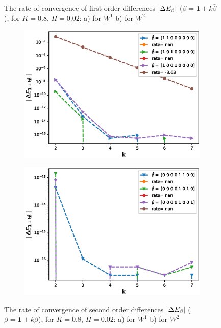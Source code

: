 \documentclass[11pt]{article}
\begin{document}
\begin{figure}[h!]
\caption{The rate of convergence of  first order differences $\left\lvert\Delta E_{\beta}\right\rvert$ ($\beta=\mathbf{1}+k \bar{\beta}$), for $K=0.8$, $H=0.02$: a) for $W^1$ b) for $W^2$}
\label{fig:first_diff_comp_K_08_H_002_wihtout_change_measure}
\end{figure}


\begin{figure}[h!]
\centering
\begin{subfigure}{.4\textwidth}
\centering
\includegraphics[width=1\linewidth]{./figures/rBergomi_mixed_error_rates/without_change_measure/N_4/H_002/mixed_difference_order2_rbergomi_4steps_H_002_K_08_totally_hierarch_with_rate_W1}
\caption{}
\label{fig:sub3}
\end{subfigure}%
\begin{subfigure}{.4\textwidth}
\centering
\includegraphics[width=1\linewidth]{./figures/rBergomi_mixed_error_rates/without_change_measure/N_4/H_002/mixed_difference_order2_rbergomi_4steps_H_002_K_08_totally_hierarch_with_rate_W2}
\caption{}
\label{fig:sub4}
\end{subfigure}

\caption{The rate of convergence of  second order differences $\left\lvert\Delta E_{\beta}\right\rvert$ ($\beta=\mathbf{1}+k \bar{\beta}$), for $K=0.8$, $H=0.02$: a) for $W^1$ b) for $W^2$}
\label{fig:second_diff_comp_K_08_H_002_wihtout_change_measure}
\end{figure}
\end{document}
